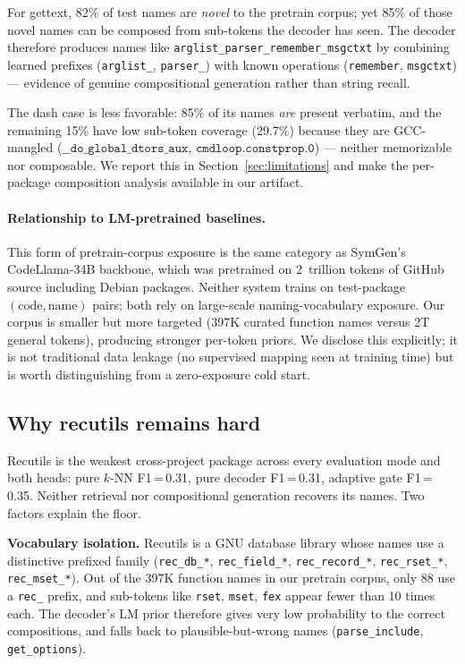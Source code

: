 For gettext, 82\% of test names are \emph{novel} to the pretrain corpus; yet 85\% of those novel names can be composed from sub-tokens the decoder has seen. The decoder therefore produces names like \texttt{arglist\_parser\_remember\_msgctxt} by combining learned prefixes (\texttt{arglist\_}, \texttt{parser\_}) with known operations (\texttt{remember}, \texttt{msgctxt}) — evidence of genuine compositional generation rather than string recall.

The dash case is less favorable: 85\% of its names \emph{are} present verbatim, and the remaining 15\% have low sub-token coverage (29.7\%) because they are GCC-mangled ($\texttt{\_\_do\_global\_dtors\_aux}$, $\texttt{cmdloop.constprop.0}$) — neither memorizable nor composable. We report this in Section~\ref{sec:limitations} and make the per-package composition analysis available in our artifact.

\paragraph{Relationship to LM-pretrained baselines.}
This form of pretrain-corpus exposure is the same category as SymGen's CodeLlama-34B backbone, which was pretrained on 2~trillion tokens of GitHub source including Debian packages. Neither system trains on test-package $(\text{code}, \text{name})$ pairs; both rely on large-scale naming-vocabulary exposure. Our corpus is smaller but more targeted (397K curated function names versus 2T general tokens), producing stronger per-token priors. We disclose this explicitly; it is not traditional data leakage (no supervised mapping seen at training time) but is worth distinguishing from a zero-exposure cold start.

\subsection{Why recutils remains hard}
\label{sec:recutils-limit}

Recutils is the weakest cross-project package across every evaluation mode and both heads: pure $k$-NN F1\,=\,0.31, pure decoder F1\,=\,0.31, adaptive gate F1\,=\,0.35. Neither retrieval nor compositional generation recovers its names. Two factors explain the floor.

\textbf{Vocabulary isolation.}
Recutils is a GNU database library whose names use a distinctive prefixed family (\texttt{rec\_db\_*}, \texttt{rec\_field\_*}, \texttt{rec\_record\_*}, \texttt{rec\_rset\_*}, \texttt{rec\_mset\_*}). Out of the 397K function names in our pretrain corpus, only 88 use a \texttt{rec\_} prefix, and sub-tokens like \texttt{rset}, \texttt{mset}, \texttt{fex} appear fewer than 10 times each. The decoder's LM prior therefore gives very low probability to the correct compositions, and falls back to plausible-but-wrong names (\texttt{parse\_include}, \texttt{get\_options}).

